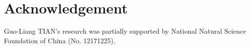 
\section*{Acknowledgement}      %

Guo-Liang TIAN's research was partially supported by National Natural Science Foundation of China (No. 12171225). 